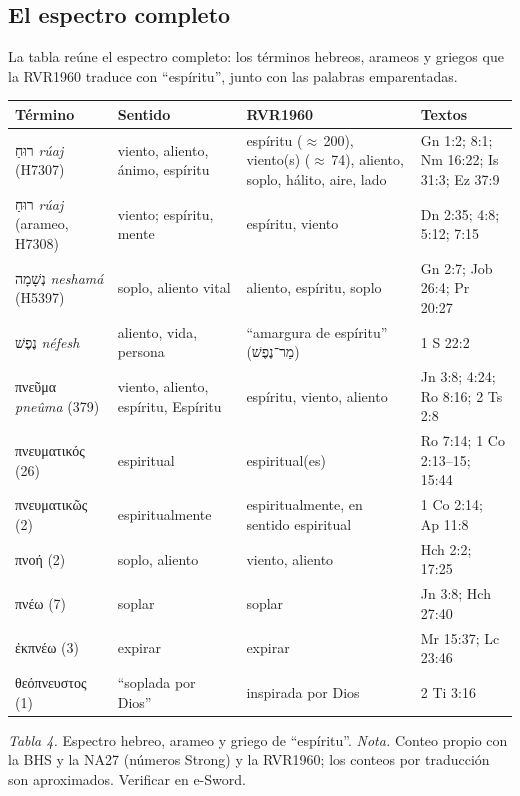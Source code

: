 \documentclass[11pt,letterpaper]{article}
\newcommand{\heb}[1]{\mbox{\foreignlanguage{hebrew}{#1}}}
\newcommand{\grc}[1]{\foreignlanguage{ancientgreek}{#1}}
\begin{document}
\subsection{El espectro completo}

La tabla reúne el espectro completo: los términos hebreos, arameos y griegos que la RVR1960 traduce con ``espíritu'', junto con las palabras emparentadas.

\begin{center}\small\renewcommand{\arraystretch}{1.18}
\begin{tabular}{@{}L{3.3cm}L{3.3cm}L{4.0cm}L{3.6cm}@{}}
\toprule
\textbf{Término} & \textbf{Sentido} & \textbf{RVR1960} & \textbf{Textos} \\ \midrule
\heb{רוּחַ} \emph{rúaj} (H7307) & viento, aliento, ánimo, espíritu & espíritu ($\approx$\,200), viento(s) ($\approx$\,74), aliento, soplo, hálito, aire, lado & Gn 1:2; 8:1; Nm 16:22; Is 31:3; Ez 37:9 \\
\heb{רוּחַ} \emph{rúaj} (arameo, H7308) & viento; espíritu, mente & espíritu, viento & Dn 2:35; 4:8; 5:12; 7:15 \\
\heb{נְשָׁמָה} \emph{neshamá} (H5397) & soplo, aliento vital & aliento, espíritu, soplo & Gn 2:7; Job 26:4; Pr 20:27 \\
\heb{נֶפֶשׁ} \emph{néfesh} & aliento, vida, persona & ``amargura de espíritu'' (\heb{מַר־נֶפֶשׁ}) & 1 S 22:2 \\ \midrule
\grc{πνεῦμα} \emph{pneûma} (379) & viento, aliento, espíritu, Espíritu & espíritu, viento, aliento & Jn 3:8; 4:24; Ro 8:16; 2 Ts 2:8 \\
\grc{πνευματικός} (26) & espiritual & espiritual(es) & Ro 7:14; 1 Co 2:13--15; 15:44 \\
\grc{πνευματικῶς} (2) & espiritualmente & espiritualmente, en sentido espiritual & 1 Co 2:14; Ap 11:8 \\
\grc{πνοή} (2) & soplo, aliento & viento, aliento & Hch 2:2; 17:25 \\
\grc{πνέω} (7) & soplar & soplar & Jn 3:8; Hch 27:40 \\
\grc{ἐκπνέω} (3) & expirar & expirar & Mr 15:37; Lc 23:46 \\
\grc{θεόπνευστος} (1) & ``soplada por Dios'' & inspirada por Dios & 2 Ti 3:16 \\
\bottomrule
\end{tabular}\par
{\footnotesize\color{gris}\textit{Tabla 4.} Espectro hebreo, arameo y griego de ``espíritu''. \textit{Nota.} Conteo propio con la BHS y la NA27 (números Strong) y la RVR1960; los conteos por traducción son aproximados. Verificar en e-Sword.}
\end{center}
\end{document}
